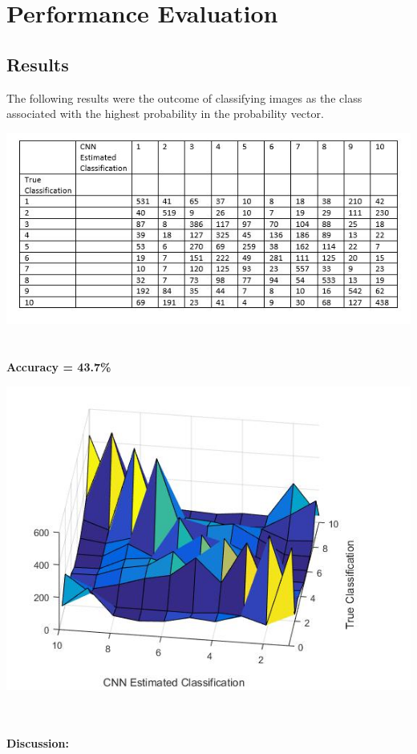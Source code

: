 \documentclass[11pt,english]{article}
\begin{document}
\section{Performance Evaluation}
\subsection{Results}
	The following results were the outcome of classifying images as the class associated with the highest probability in the probability vector.
\begin{center}
	\includegraphics[scale=0.7]{confusionmatrix}
	~\\~\\
	
		\textbf{Accuracy = 43.7\%}
\end{center}


\begin{center}
	\includegraphics[scale=0.6]{confsurf}
	~\\~\\
\end{center}
\textbf{Discussion:}
\end{document}
